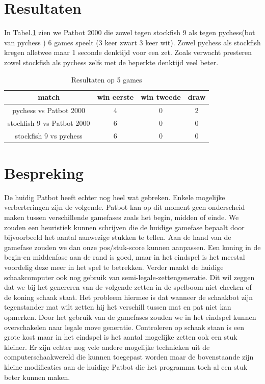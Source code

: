 \documentclass[a4paper,10pt]{article}
\begin{document}

\section{Resultaten} 
In Tabel.\ref{tab:result} zien we Patbot 2000 die zowel tegen stockfish 9 als tegen pychess(bot van pychess ) 6 games speelt (3 keer zwart 3 keer wit).
Zowel pychess als stockfish kregen alletwee maar 1 seconde denktijd voor een zet.
Zoals verwacht presteren zowel stockfish als pychess zelfs met de beperkte denktijd veel beter.

\begin{table}[H]
    \caption{Resultaten op 5 games}
    \label{tab:result}

    \begin{center}
        \begin{tabular}{|c|c|c|c|}
            \hline
           match & win eerste & win tweede & draw \\
           \hline
           pychess vs Patbot 2000  & 4 & 0 & 2\\
            \hline
           stockfish 9 vs Patbot 2000  & 6 & 0 & 0\\
           \hline
           stockfish 9 vs pychess  & 6 & 0 & 0 \\
            \hline
        \end{tabular}
    \end{center}
\end{table}

\section{Bespreking}
De huidig Patbot heeft echter nog heel wat gebreken. Enkele mogelijke verberteringen zijn de volgende.
Patbot kan op dit moment geen onderscheid maken tussen verschillende gamefases zoals het begin, midden of einde.
We zouden een heuristiek kunnen schrijven die de huidige gamefase bepaalt door bijvoorbeeld het aantal aanwezige stukken te tellen.
Aan de hand van de gamefase zouden we dan onze pos/stuk-score kunnen aanpassen.
Een koning in de begin-en middenfase aan de rand is goed, maar in het eindspel is het meestal voordelig deze meer in het spel te betrekken.
Verder maakt de huidige schaakcomputer ook nog gebruik van semi-legale-zettengeneratie. Dit wil zeggen dat we bij het genereren van de volgende zetten in de spelboom niet checken of de koning schaak staat. Het probleem hiermee is dat wanneer de schaakbot zijn tegenstander mat wilt zetten hij het verschill tussen mat en pat niet kan opmerken.
Door het gebruik van de gamefases zouden we in het eindspel kunnen overschakelen naar legale move generatie. Controleren op schaak staan is een grote kost maar in het eindspel is het aantal mogelijke zetten ook een stuk kleiner.
Er zijn echter nog vele andere mogelijke technieken uit de computerschaakwereld die kunnen toegepast worden maar de bovenstaande zijn kleine modificaties aan de huidige Patbot die het programma toch al een stuk beter kunnen maken.
\end{document}
